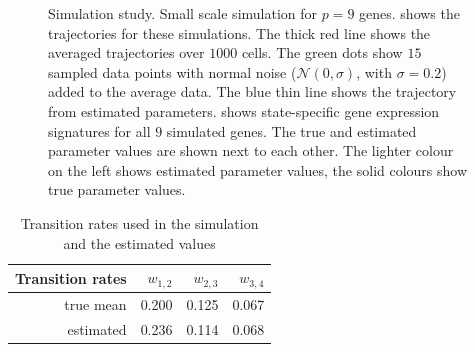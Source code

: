 \begin{figure}
  \centering
  \caption{Simulation study. Small scale simulation for $p=9$ genes.  shows the trajectories for these simulations. The thick red line shows the averaged trajectories over $1000$ cells. The green dots show $15$ sampled data points with normal noise ($\mathcal{N}(0, \sigma)$, with $\sigma=0.2$) added to the average data. The blue thin line shows the trajectory from estimated parameters.  shows state-specific gene expression signatures for all $9$ simulated genes. The true and estimated parameter values are shown next to each other. The lighter colour on the left shows estimated parameter values, the solid colours show true parameter values.}
  \label{fig:small-scale-sim}
\end{figure}

\begin{table}[h]
    \centering
\begin{tabular}{r|rrr}
  \hline \hline
  \bf{Transition rates}& $w_{1,2}$ & $w_{2,3}$ & $w_{3,4}$ \\
  \hline
  true mean & 0.200 & 0.125 & 0.067 \\
  estimated & 0.236 & 0.114 & 0.068 \\
   \hline
 \end{tabular}
 \caption{Transition rates used in the simulation and the estimated values}
 \label{tab:fit-w}
\end{table}

